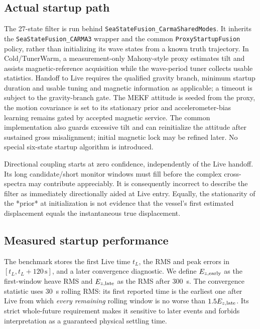 \documentclass[conference]{IEEEtran}
\newcommand{\InputPart}[1]{}
\begin{document}
\subsection{Actual startup path}
The 27-state filter is run behind
\texttt{SeaStateFusion\_CarmaSharedModes}. It inherits the
\texttt{SeaStateFusion\_CARMA3} wrapper and the common
\texttt{ProxyStartupFusion} policy, rather than initializing its wave
states from a known truth trajectory. In Cold/TunerWarm, a measurement-only
Mahony-style proxy \cite{mahony08} estimates tilt and assists magnetic-reference
acquisition while the wave-period tuner collects usable statistics.
Handoff to Live requires the qualified gravity branch, minimum startup
duration and usable tuning and magnetic information as applicable; a
timeout is subject to the gravity-branch gate. The MEKF attitude is seeded
from the proxy, the motion covariance is set to its stationary prior and
accelerometer-bias learning remains gated by accepted magnetic service.
The common implementation also guards excessive tilt and can reinitialize
the attitude after sustained gross misalignment; initial magnetic lock
may be refined later. No special six-state startup algorithm is introduced.

Directional coupling starts at zero confidence, independently of the
Live handoff. Its long candidate/short monitor windows must fill before
the complex cross-spectra may contribute appreciably. It is consequently
incorrect to describe the filter as immediately directionally aided at
Live entry. Equally, the stationarity of the *prior* at initialization is
not evidence that the vessel's first estimated displacement equals the
instantaneous true displacement.

\subsection{Measured startup performance}
The benchmark stores the first Live time $t_L$, the RMS and peak errors in
$[t_L,t_L+120\,\mathrm{s}]$, and a later convergence diagnostic. We define
$E_{z,\rm early}$ as the first-window heave RMS and $E_{z,\rm late}$ as
the RMS after \SI{300}{s}. The convergence statistic uses \SI{30}{s}
rolling RMS: its first reported time is the earliest one after Live from
which \emph{every remaining} rolling window is no worse than
$1.5E_{z,\rm late}$. Its strict whole-future requirement makes it sensitive
to later events and forbids interpretation as a guaranteed physical
settling time.

\begin{table}[!t]
\caption{Startup in the nine \emph{fixed} seas ($9\times30=270$ paired
realizations per filter). Each entry is a median across runs, except the
95th-percentile Live time and the fraction meeting the strict convergence
criterion within 300 s \emph{after Live}. ``Early/late'' is the median of
the \emph{within-run} RMS ratios, not a ratio of pooled RMS values.}
\label{tab:startup}
\centering\small
\InputPart{csm27-paper-startup.tex-part}
\end{table}
\end{document}
